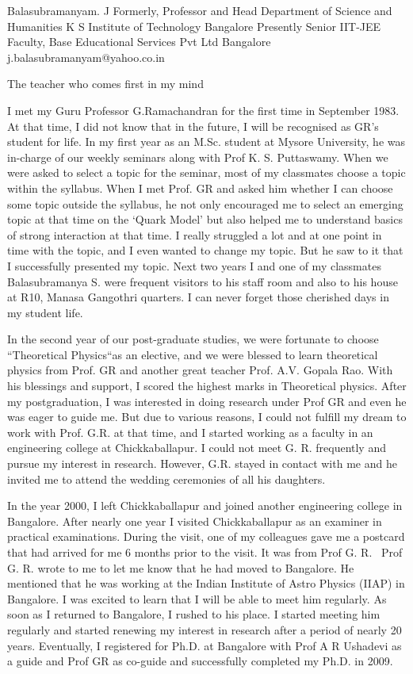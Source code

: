 Balasubramanyam. J
Formerly, Professor and Head
Department of Science and Humanities
K S Institute of Technology
Bangalore
Presently 
Senior IIT-JEE Faculty, 
Base Educational Services Pvt Ltd
Bangalore
j.balasubramanyam@yahoo.co.in

The teacher who comes first in my mind

I met my Guru Professor G.Ramachandran for the first time in September 1983. At that time, I did not know that in the future, I will be recognised as GR’s student for life. In my first year as an M.Sc. student at Mysore University, he was in-charge of our weekly seminars along with Prof K. S. Puttaswamy. When we were asked to select a topic for the seminar, most of my classmates choose a topic within the syllabus. When I met Prof. GR and asked him whether I can choose some topic outside the syllabus, he not only encouraged me to select an emerging topic at that time on the ‘Quark Model’ but also helped me to understand basics of strong interaction at that time. I really struggled a lot and at one point in time with the topic, and I even wanted to change my topic. But he saw to it that I successfully presented my topic. Next two years I and one of my classmates Balasubramanya S. were frequent visitors to his staff room and also to his house at R10, Manasa Gangothri quarters. I can never forget those cherished days in my student life. 

In the second year of our post-graduate studies, we were fortunate to choose “Theoretical Physics“as an elective, and we were blessed to learn theoretical physics from Prof. GR and another great teacher Prof. A.V. Gopala Rao. With his blessings and support, I scored the highest marks in Theoretical physics. After my postgraduation, I was interested in doing research under Prof GR and even he was eager to guide me. But due to various reasons, I could not fulfill my dream to work with Prof. G.R. at that time, and I started working as a faculty in an engineering college at Chickkaballapur. I could not meet G. R. frequently and pursue my interest in research. However, G.R. stayed in contact with me and he invited me to attend the wedding ceremonies of all his daughters. 

In the year 2000, I left Chickkaballapur and joined another engineering college in Bangalore. After nearly one year I visited Chickkaballapur as an examiner in practical examinations. During the visit, one of my colleagues gave me a postcard that had arrived for me 6 months prior to the visit. It was from Prof G. R.  Prof G. R. wrote to me to let me know that he had moved to Bangalore. He mentioned that he was working at the Indian Institute of Astro Physics (IIAP) in Bangalore. I was excited to learn that I will be able to meet him regularly. As soon as I returned to Bangalore, I rushed to his place. I started meeting him regularly and started renewing my interest in research after a period of nearly 20 years. Eventually, I registered for Ph.D. at Bangalore with Prof A R Ushadevi as a guide and Prof GR as co-guide and successfully completed my Ph.D. in 2009. 

